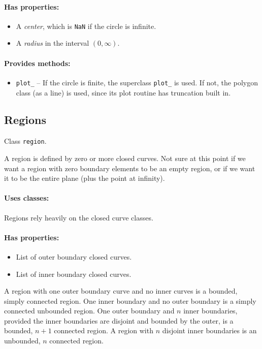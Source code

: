 \documentclass[12pt]{article}
\begin{document}
\paragraph{Has properties:}
\begin{itemize}
  \item A \emph{center}, which is \verb+NaN+ if the circle is infinite.
  \item A \emph{radius} in the interval $(0,\infty)$.
\end{itemize}

\paragraph{Provides methods:}
\begin{itemize}
  \item \verb+plot_+ -- If the circle is finite, the superclass \verb+plot_+ is used. If not, the polygon class (as a line) is used, since its plot routine has truncation built in.
\end{itemize}

\subsection{Regions}
Class \verb+region+.

A region is defined by zero or more closed curves. Not sure at this point if we want a region with zero boundary elements to be an empty region, or if we want it to be the entire plane (plus the point at infinity).

\paragraph{Uses classes:} Regions rely heavily on the closed curve classes.

\paragraph{Has properties:}
\begin{itemize}
  \item List of outer boundary closed curves.
  \item List of inner boundary closed curves.
\end{itemize}

A region with one outer boundary curve and no inner curves is a bounded, simply connected region. One inner boundary and no outer boundary is a simply connected unbounded region. One outer boundary and $n$ inner boundaries, provided the inner boundaries are disjoint and bounded by the outer, is a bounded, $n+1$ connected region. A region with $n$ disjoint inner boundaries is an unbounded, $n$ connected region.
\end{document}
